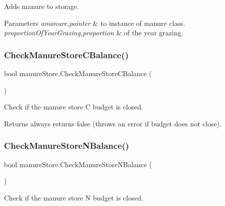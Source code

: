 Adds manure to storage. 


\begin{DoxyParams}{Parameters}
{\em amanure,pointer} & to instance of manure class. \\
\hline
{\em proportion\+Of\+Year\+Grazing,proportion} & of the year grazing. \\
\hline
\end{DoxyParams}
\mbox{\label{classmanure_store_a15e3ef4a2d1ffe2d556b213ff2b5c378}} 
\subsubsection{\texorpdfstring{CheckManureStoreCBalance()}{CheckManureStoreCBalance()}}
{\footnotesize\ttfamily bool manure\+Store.\+Check\+Manure\+Store\+C\+Balance (\begin{DoxyParamCaption}{ }\end{DoxyParamCaption})\hspace{0.3cm}{\ttfamily [inline]}}



Check if the manure store C budget is closed. 

\begin{DoxyReturn}{Returns}
always returns false (throws an error if budget does not close). 
\end{DoxyReturn}
\mbox{\label{classmanure_store_a6aa8b1751c4d53ac68ec113efc055c1d}} 
\subsubsection{\texorpdfstring{CheckManureStoreNBalance()}{CheckManureStoreNBalance()}}
{\footnotesize\ttfamily bool manure\+Store.\+Check\+Manure\+Store\+N\+Balance (\begin{DoxyParamCaption}{ }\end{DoxyParamCaption})\hspace{0.3cm}{\ttfamily [inline]}}



Check if the manure store N budget is closed. 


